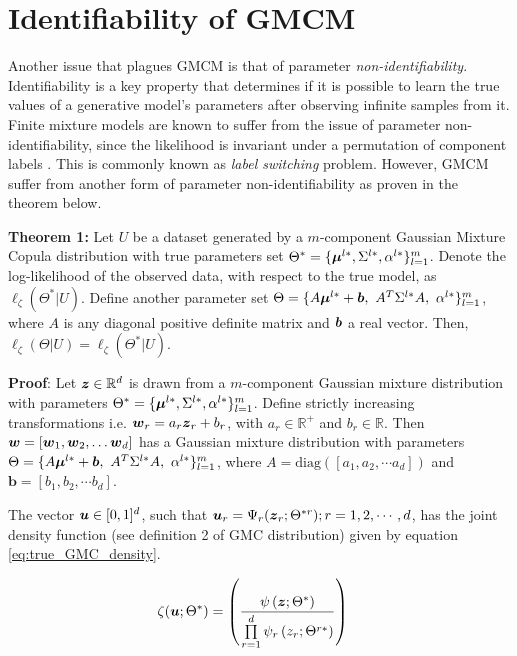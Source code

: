 \documentclass{article}
\begin{document}
\section{Identifiability of GMCM}\label{sec:identifiability_GMCM}
Another issue that plagues GMCM is that of parameter \emph{non-identifiability}. Identifiability is a key property that determines if it is possible to learn the true values of a generative model's parameters after observing infinite samples from it. Finite mixture models are known to suffer from the issue of parameter non-identifiability, since the likelihood is invariant under a permutation of component labels \citep[see][]{Stephens2000}. This is commonly known as \emph{label switching} problem. However, GMCM suffer from another form of parameter non-identifiability as proven in the theorem below.

  

\textbf{Theorem 1:} Let $U$ be a dataset generated by a $m$-component Gaussian Mixture Copula distribution with true parameters set $\Theta^* = \{\boldsymbol{\mu}^{l*}, \Sigma^{l*}, \alpha^{l*}\}_{l=1}^m$. Denote the log-likelihood of the observed data, with respect to the true model, as $\ell_\zeta(\Theta^*|U)$. Define another parameter set $\Theta= \{A\bs{\mu}^{l*}+\bs{b}, \ A^T\Sigma^{l*}A, \ \alpha^{l*}\}_{l=1}^m$, where $A$ is any diagonal positive definite matrix and $\boldsymbol{b}$ a real vector. Then, $\ell_\zeta(\Theta|U) = \ell_\zeta(\Theta^*|U)$.

 

\textbf{Proof}:  Let $\boldsymbol{z}\in \mathbb{R}^d$ is drawn from a $m$-component Gaussian mixture distribution with parameters $\Theta^* = \{\boldsymbol{\mu}^{l*}, \Sigma^{l*}, \alpha^{l*}\}_{l=1}^m$. Define strictly increasing transformations i.e. $\boldsymbol{w}_r = a_r \boldsymbol{z}_r+b_r$, with $a_r \in \mathbb{R}^+$ and $b_r \in \mathbb{R}$. Then $\boldsymbol{w}= [\boldsymbol{w}_1, \boldsymbol{w}_2,\ldots \boldsymbol{w}_d]$  has a Gaussian mixture distribution with parameters  $\Theta= \{A\bs{\mu}^{l*}+\bs{b}, \ A^T\Sigma^{l*}A, \ \alpha^{l*}\}_{l=1}^m$, where $A = \text{diag}([a_1, a_2, \cdots a_d])$ and $\textbf{b}=[b_1, b_2, \cdots b_d]$.

 

The vector $\boldsymbol{u}\in [0,1]^d$, such that $\boldsymbol{u}_r = \Psi_r(\boldsymbol{z}_r;\Theta^{*r}); r=1,2,\cdots, d $, has the joint density function (see definition 2 of GMC distribution) given by equation \eqref{eq:true_GMC_density}.

\begin{align}\label{eq:true_GMC_density}
\zeta(\boldsymbol{u};\Theta^*) & = \left( \frac{\psi\left(\boldsymbol{z};\Theta^*\right)}{\prod\limits_{r=1}^{d}\psi_r\left(z_r;\Theta^{r*} \right)} \right)
\end{align}
\end{document}
